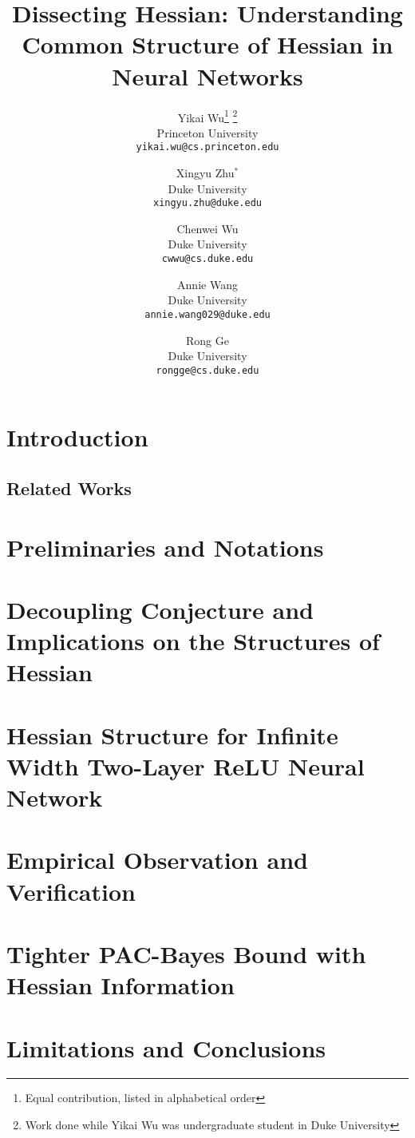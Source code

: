 \documentclass{article}
\title{Dissecting Hessian: Understanding Common Structure of Hessian in Neural Networks}
\author{
  Yikai Wu\thanks{Equal contribution, listed in alphabetical order}
  \thanks{Work done while Yikai Wu was undergraduate student in Duke University}\\
  Princeton University\\
  \texttt{yikai.wu@cs.princeton.edu}
  \and
  Xingyu Zhu$^*$\\
  Duke University\\
  \texttt{xingyu.zhu@duke.edu}
  \and
  Chenwei Wu\\
  Duke University\\
  \texttt{cwwu@cs.duke.edu}
  \and
  Annie Wang\\
  Duke University\\
  \texttt{annie.wang029@duke.edu}
  \and
  Rong Ge\\
  Duke University\\
  \texttt{rongge@cs.duke.edu}
}
\theoremstyle{definition}
\begin{document}
\maketitle

\begin{abstract}

\end{abstract}

\section{Introduction}


\subsection{Related Works}


\section{Preliminaries and Notations}


\section{Decoupling Conjecture and Implications on the Structures of Hessian}


\section{Hessian Structure for Infinite Width Two-Layer ReLU Neural Network}
\label{sec:theoretical}


\section{Empirical Observation and Verification}


\section{Tighter PAC-Bayes Bound with Hessian Information}


\section{Limitations and Conclusions}






\appendix


\end{document}
